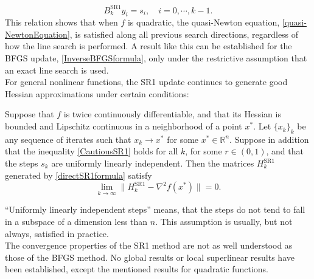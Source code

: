 \begin{equation}\label{HereditaryProperty}
    B^{\mathrm{SR1}}_k y_i = s_i, \quad i = 0, \cdots, k-1.
\end{equation}
This relation shows that when $f$ is quadratic, the quasi-Newton equation, \cref{quasi-NewtonEquation}, is satisfied along all previous search directions, regardless of how the line search is performed. A result like this can be established for the BFGS update, \cref{InverseBFGSformula}, only under the restrictive assumption that an exact line search is used. \\
For general nonlinear functions, the SR1 update continues to generate good Hessian approximations under certain conditions:
\begin{theorem}
    Suppose that $f$ is twice continuously differentiable, and that its Hessian is bounded and Lipschitz continuous in a neighborhood of a point $x^{*}$. Let $\{x_k\}_k$ be any sequence of iterates such that $x_k \rightarrow x^{*}$ for some $x^{*} \in \mathbb{R}^n$. Suppose in addition that the inequality \cref{CautiousSR1} holds for all $k$, for some $r \in (0,1)$, and that the steps $s_k$ are uniformly linearly independent. Then the matrices $H^{\mathrm{SR1}}_k$ generated by \cref{directSR1formula} satisfy
    \begin{equation*}
        \lim_{k \to \infty} \lVert H^{\mathrm{SR1}}_k - \nabla^2 f(x^{*}) \rVert = 0.
    \end{equation*}
\end{theorem}

“Uniformly linearly independent steps” means, that the steps do not tend to fall in a subspace of a dimension less than $n$. This assumption is usually, but not always, satisfied in practice. \\
The convergence properties of the SR1 method are not as well understood as those of the BFGS method. No global results or local superlinear results have been established, except the mentioned results for quadratic functions.


